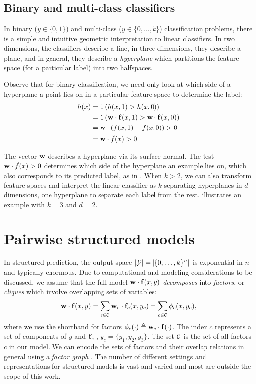 \subsection{Binary and multi-class classifiers}
\label{sec:binary-multi-class}
In binary ($y \in \{0,1\}$) and multi-class ($y \in \{0,\ldots,k\}$) 
classification problems, there is a simple and intuitive geometric 
interpretation to linear classifiers.  In two dimensions, the classifiers 
describe a line, in three dimensions, they describe a plane, and in general, 
they describe a {\em hyperplane} which partitions the feature space (for a 
particular label) into two halfspaces.  

Observe that for binary classification, we need only look at which side of a 
hyperplane a point lies on in a particular feature space to determine the 
label:
\begin{align}
h(x) &= \mathbf{1}\left( h(x,1) > h(x,0)\right) \\
&= \mathbf{1}\left( \mathbf{w} \cdot \mathbf{f}(x,1) > \mathbf{w} \cdot \mathbf{f}(x,0) \right) \\
&= \mathbf{w} \cdot \left(f(x,1) - f(x,0)\right)  > 0\\ 
&= \mathbf{w} \cdot \tilde{f}(x) > 0 
\end{align}

The vector $\mathbf{w}$ describes a hyperplane via its surface normal.  The test $\mathbf{w} 
\cdot \tilde{f}(x) > 0$ determines which side of the hyperplane an example lies 
on, which also corresponds to its predicted label, as 
in .  When $k > 2$, we can also transform 
feature spaces and interpret the linear classifier as $k$ separating 
hyperplanes in $d$ dimensions, one hyperplane to separate each label from the 
rest.   illustrates an example with $k = 
3$ and $d = 2$.

\section{Pairwise structured models}
\label{sec:mrfs}
In structured prediction, the output space $|\mathcal{Y}| = |\{0,\ldots,k\}^n|$ is 
exponential in $n$ and typically enormous. Due to computational and modeling 
considerations to be discussed, we assume that the full model $\mathbf{w} \cdot 
\mathbf{f}(x,y)$ {\em decomposes} into {\em factors}, or {\em cliques} which involve 
overlapping sets of variables:  \begin{equation}
\mathbf{w} \cdot \mathbf{f}(x,y) = \sum_{c \in \mathcal{C}} \mathbf{w}_c \cdot \mathbf{f}_c(x,y_c) = \sum_{c \in \mathcal{C}} 
\phi_c(x,y_c),
\end{equation}
where we use the shorthand for factors $\phi_c(\cdot) \triangleq \mathbf{w}_c \cdot 
\mathbf{f}(\cdot)$.  The index $c$ represents a set of components of $y$ and $\mathbf{f}$, \eg, 
$y_c = \{y_1,y_2,y_3\}$. The set $\mathcal{C}$ is the set of all factors $c$ in our 
model.  We can encode the sets of factors and their overlap relations in 
general using a {\em factor graph} \citep{koller-book}.  The number of 
different settings and representations for structured models is vast and varied 
and most are outside the scope of this work.  

